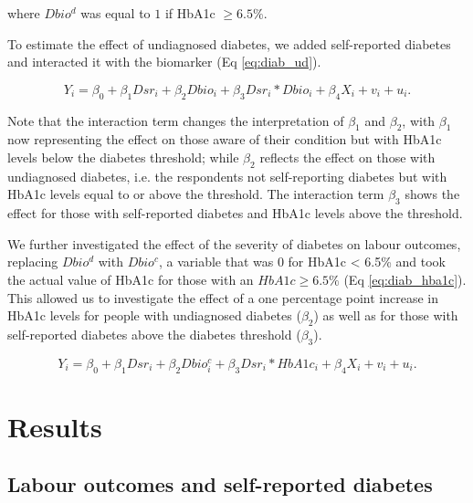 \documentclass[12pt,english]{article}
\begin{document}
where $Dbio^{d}$ was equal to $1$ if \ac{HbA1c} $\geq6.5\%$. 

To estimate the effect of undiagnosed diabetes, we added self-reported diabetes and interacted it with the biomarker (Eq \ref{eq:diab_ud}).

\begin{equation}
Y_{i}=\beta_{0}+\beta_{1}Dsr_{i}+\beta_{2}Dbio_{i}+\beta_{3}Dsr_{i}*Dbio_{i}+\beta_{4}X_{i}+v_{i}+u_{i}.\label{eq:diab_ud}
\end{equation}

Note that the interaction term changes the interpretation of $\beta_{1}$ and $\beta_{2}$, with $\beta_{1}$ now representing the effect on those aware of their condition but with \ac{HbA1c} levels below the diabetes threshold; while $\beta_{2}$ reflects the effect on those with undiagnosed diabetes, i.e. the respondents not self-reporting diabetes but with \ac{HbA1c} levels equal to or above the threshold. The interaction term $\beta_{3}$ shows the effect for those with self-reported diabetes and \ac{HbA1c} levels above the threshold.

We further investigated the effect of the severity of diabetes on labour outcomes, replacing $Dbio^{d}$ with $Dbio^{c}$, a variable that was $0$ for \ac{HbA1c} < 6.5\% and took the actual value of \ac{HbA1c} for those with an $HbA1c \geq 6.5\%$ (Eq \ref{eq:diab_hba1c}). This allowed us to investigate the effect of a one percentage point increase in \ac{HbA1c} levels for people with undiagnosed diabetes ($\beta_{2}$) as well as for those with self-reported diabetes above the diabetes threshold ($\beta_{3}$).

\begin{equation}
Y_{i}=\beta_{0}+\beta_{1}Dsr_{i}+\beta_{2}Dbio^{c}_{i}+\beta_{3}Dsr_{i}*HbA1c_{i}+\beta_{4}X_{i}+v_{i}+u_{i}.\label{eq:diab_hba1c}
\end{equation}

\section{\label{sec:cha_4_results}Results}


\subsection{Labour outcomes and self-reported diabetes}
\end{document}
